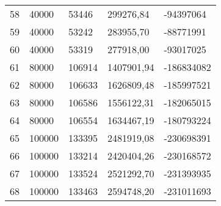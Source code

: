 \begin{longtable}{lllll}
    58               & 40000          & 53446          & 299276,84   & -94397064       \\
    59               & 40000          & 53242          & 283955,70   & -88771991       \\
    60               & 40000          & 53319          & 277918,00   & -93017025       \\
    61               & 80000          & 106914         & 1407901,94  & -186834082      \\
    62               & 80000          & 106633         & 1626809,48  & -185997521      \\
    63               & 80000          & 106586         & 1556122,31  & -182065015      \\
    64               & 80000          & 106554         & 1634467,19  & -180793224      \\
    65               & 100000         & 133395         & 2481919,08  & -230698391      \\
    66               & 100000         & 133214         & 2420404,26  & -230168572      \\
    67               & 100000         & 133524         & 2521292,70  & -231393935      \\
    68               & 100000         & 133463         & 2594748,20  & -231011693      
\end{longtable}

